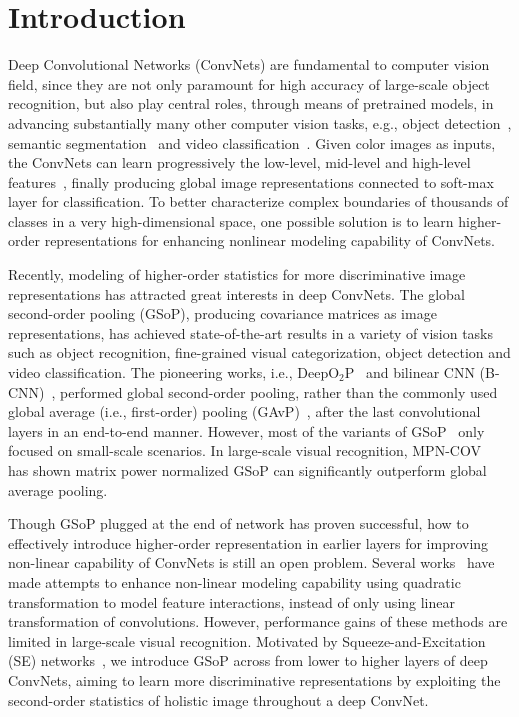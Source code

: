 \documentclass[10pt,twocolumn,letterpaper]{article}
\begin{document}
\section{Introduction}

Deep Convolutional  Networks (ConvNets)  are fundamental to computer vision field, since they are  not only paramount  for high accuracy of large-scale object recognition, but also play central roles, through means of pretrained models, in   advancing  substantially many other computer vision tasks,  e.g., object detection~\cite{Redmon_2017_CVPR}, semantic segmentation~\cite{Long_2015_CVPR} and video classification~\cite{Wang_2018_CVPR_nonlocal}.  
Given color images as inputs, the ConvNets can learn progressively the low-level, mid-level and high-level features~\cite{Zeiler2014}, finally producing  global image representations connected to  soft-max layer for classification. To better characterize complex boundaries of thousands of classes in a very high-dimensional space, one possible solution is to learn higher-order representations for enhancing nonlinear modeling capability of ConvNets. 

Recently, modeling of higher-order statistics for more discriminative image representations  has attracted great interests in deep ConvNets. The global second-order pooling (GSoP), producing covariance matrices as image representations, has achieved state-of-the-art results in a variety of vision tasks~\cite{Li_2018_CVPR,Cui_2017_CVPR,Wang_2018_CVPR,WangYunbo_2017_CVPR} such as  object recognition, fine-grained visual categorization, object detection and video classification.  The pioneering  works, i.e., DeepO$_{2}$P~\cite{Ionescu_2015_ICCV} and  bilinear CNN (B-CNN)~\cite{lin2015bilinear}, performed  global second-order pooling, rather than the commonly used global average (i.e., first-order) pooling (GAvP)~\cite{Lin_ICLR_2014_GFoP},  after the last convolutional layers in an end-to-end manner. However, most of the variants of GSoP~\cite{Gao_2016_CVPR,Cai_2017_ICCV} only focused on small-scale scenarios. In large-scale visual recognition,  MPN-COV~\cite{Li_2017_ICCV,Li_2018_CVPR} has shown matrix power normalized GSoP can significantly  outperform global average pooling. 


Though GSoP plugged at the end of network  has proven successful,  how to effectively introduce higher-order representation in earlier layers for improving non-linear capability of ConvNets is still an open problem. Several works~\cite{LiYanghao_2017_ICCV,Wang_2017_ICCV,Zoumpourlis_2017_ICCV} have made attempts  to enhance non-linear
modeling capability using quadratic transformation to model feature interactions, instead of only using linear transformation of convolutions.  However, performance gains of these
methods are limited in large-scale visual recognition.   Motivated by Squeeze-and-Excitation (SE) networks~\cite{Hu_2018_CVPR_SE}, we introduce GSoP across from lower to higher layers of deep ConvNets,  aiming to learn more discriminative  representations  by exploiting the second-order statistics of holistic image throughout a deep ConvNet.
\end{document}
